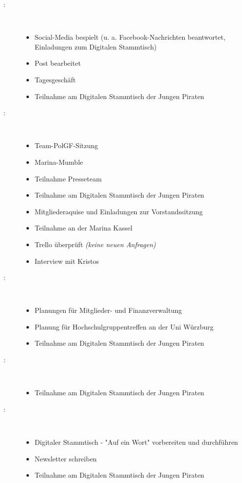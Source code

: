 \begin{Protokoll}
    
    \begin{description}
        \item[:] \     
        \begin{itemize}
            \item Social-Media bespielt (u. a. Facebook-Nachrichten beantwortet, Einladungen zum Digitalen Stammtisch)
            \item Post bearbeitet
            \item Tagesgeschäft 
          \item Teilnahme am Digitalen Stammtisch der Jungen Piraten
        \end{itemize}
        \item[:] \     
        \begin{itemize}
          \item Team-PolGF-Sitzung
          \item Marina-Mumble 
          \item Teilnahme Presseteam
          \item Teilnahme am Digitalen Stammtisch der Jungen Piraten
          \item Mitgliederaquise und Einladungen zur Vorstandssitzung
          \item Teilnahme an der Marina Kassel
          \item Trello überprüft \emph{(keine neuen Anfragen)}
          \item Interview mit Kristos
        \end{itemize}
        \item[:] \     
        \begin{itemize}
            \item Planungen für Mitglieder- und Finanzverwaltung
            \item Planung für Hochschulgruppentreffen an der Uni Würzburg
            \item Teilnahme am Digitalen Stammtisch der Jungen Piraten
        \end{itemize}
        \item[\getPersonAsWebsiteLink{ElH}:] \     
        \begin{itemize}
          \item Teilnahme am Digitalen Stammtisch der Jungen Piraten
        \end{itemize}
        \item[\getPersonAsWebsiteLink{FeW}:] \     
        \begin{itemize}
            \item Digitaler Stammtisch - "Auf ein Wort" vorbereiten und durchführen
            \item Newsletter schreiben
            \item Teilnahme am Digitalen Stammtisch der Jungen Piraten
        \end{itemize}
    \end{description}
    

\end{Protokoll}
